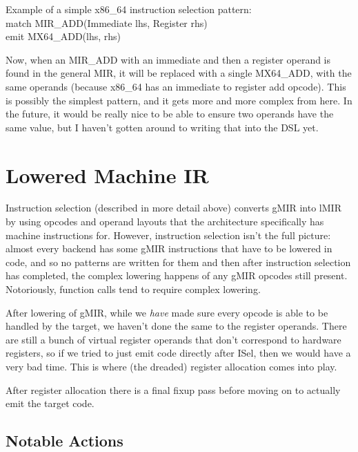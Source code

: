 \documentclass[12pt]{article}
\begin{document}
\vspace{1ex}
Example of a simple x86\_64 instruction selection pattern:\\
\indent \indent match MIR\_ADD(Immediate lhs, Register rhs)\\
\indent \indent emit MX64\_ADD(lhs, rhs)
\vspace{1ex}

Now, when an MIR\_ADD with an immediate and then a register operand is found in the general MIR, it will be replaced with a single MX64\_ADD, with the same operands (because x86\_64 has an immediate to register add opcode). This is possibly the simplest pattern, and it gets more and more complex from here. In the future, it would be really nice to be able to ensure two operands have the same value, but I haven't gotten around to writing that into the DSL yet.

\section{Lowered Machine IR}
\label{sec:lowered-machine-ir}

Instruction selection (described in more detail above) converts gMIR into lMIR by using opcodes and operand layouts that the architecture specifically has machine instructions for. However, instruction selection isn't the full picture: almost every backend has some gMIR instructions that have to be lowered in code, and so no patterns are written for them and then after instruction selection has completed, the complex lowering happens of any gMIR opcodes still present. Notoriously, function calls tend to require complex lowering.

After lowering of gMIR, while we \emph{have} made sure every opcode is able to be handled by the target, we haven't done the same to the register operands. There are still a bunch of virtual register operands that don't correspond to hardware registers, so if we tried to just emit code directly after ISel, then we would have a very bad time. This is where (the dreaded) register allocation comes into play.

After register allocation there is a final fixup pass before moving on to actually emit the target code.


\subsection{Notable Actions}
\label{subsec:lowered-machine-ir:notable-actions}
\end{document}
